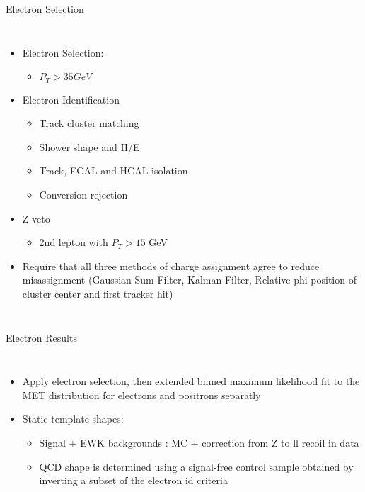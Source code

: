 \documentclass[t, 8pt]{beamer}
\begin{document}
\begin{frame}{Electron Selection}
  \begin{columns}[c]
  \begin{itemize}
    \item Electron Selection:
    \begin{itemize}
      \item $P_T > 35 GeV$
    \end{itemize}
    \item Electron Identification
    \begin{itemize}
      \item Track cluster matching
      \item Shower shape and H/E
      \item Track, ECAL and HCAL isolation
      \item Conversion rejection
    \end{itemize}
    \item Z veto
    \begin{itemize}
      \item 2nd lepton with $P_T > 15$ GeV
    \end{itemize}
    \item Require that all three methods of charge assignment agree to reduce
    misassignment (Gaussian Sum Filter, Kalman Filter, Relative phi position of
    cluster center and first tracker hit)
  \end{itemize}
  \end{columns}
\end{frame}

\begin{frame}{Electron Results}
  \begin{columns}[c]
  \begin{itemize}
    \item Apply electron selection, then extended binned maximum likelihood fit to the MET distribution for electrons and positrons separatly
    \item Static template shapes:
    \begin{itemize}
      \item Signal + EWK backgrounds : MC + correction from Z to ll recoil in data 
      \item QCD shape is determined using a signal-free control sample obtained by inverting a subset of the electron id criteria
    \end{itemize}
  \end{itemize}
  \end{columns}
\end{frame}
\end{document}
